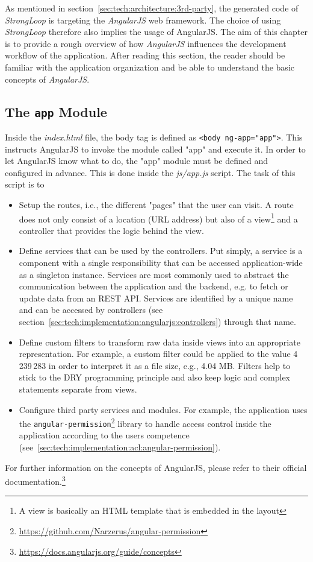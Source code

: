 \documentclass[nochapterpage,nopartpage,noheadingspace,numbersubsubsec,bigchapter,colorback,accentcolor=tud9c,10pt]{tudreport}
\begin{document}
    As mentioned in section~\ref{sec:tech:architecture:3rd-party}, the generated code of \emph{StrongLoop} is targeting the \emph{AngularJS} web framework. The choice of using \emph{StrongLoop} therefore also implies the usage of AngularJS. The aim of this chapter is to provide a rough overview of how \emph{AngularJS} influences the development workflow of the application. After reading this section, the reader should be familiar with the application organization and be able to understand the basic concepts of \emph{AngularJS}.

  \subsection{The \texttt{app} Module}
  \label{sec:tech:implementation:angularjs:app}

    Inside the \emph{index.html} file, the body tag is defined as \texttt{<body ng-app="app">}. This instructs AngularJS to invoke the module called "app" and execute it. In order to let AngularJS know what to do, the "app" module must be defined and configured in advance. This is done inside the \emph{js/app.js} script. The task of this script is to
        \begin{itemize}
            \setlength\itemsep{0em}
            \item Setup the routes, i.e., the different "pages" that the user can visit. A route does not only consist of a location (URL address) but also of a view\footnote{A view is basically an HTML template that is embedded in the layout} and a controller that provides the logic behind the view.
            \item Define services that can be used by the controllers. Put simply, a service is a component with a single responsibility that can be accessed application-wide as a singleton instance. Services are most commonly used to abstract the communication between the application and the backend, e.g. to fetch or update data from an REST API. Services are identified by a unique name and can be accessed by controllers (see section~\ref{sec:tech:implementation:angularjs:controllers}) through that name.
            \item Define custom filters to transform raw data inside views into an appropriate representation. For example, a custom filter could be applied to the value 4\,239\,283 in order to interpret it as a file size, e.g., 4.04 MB. Filters help to stick to the DRY programming principle and also keep logic and complex statements separate from views.
            \item Configure third party services and modules. For example, the application uses the \texttt{angular-permission}\footnote{\url{https://github.com/Narzerus/angular-permission}} library to handle access control inside the application according to the users competence (see~\ref{sec:tech:implementation:acl:angular-permission}).
        \end{itemize}
    For further information on the concepts of AngularJS, please refer to their official documentation.\footnote{\url{https://docs.angularjs.org/guide/concepts}}
\end{document}
